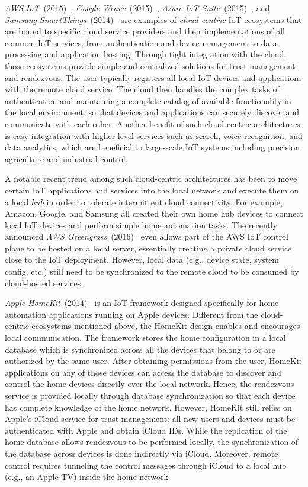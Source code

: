 \emph{AWS IoT}~(2015)~\cite{aws-iot}, \emph{Google Weave}~(2015)~\cite{weave}, \emph{Azure IoT Suite}~(2015)~\cite{azure-iot}, and \emph{Samsung SmartThings}~(2014)~\cite{smartthings} are examples of \emph{cloud-centric} IoT ecosystems that are bound to specific cloud service providers and their implementations of all common IoT services, from authentication and device management to data processing and application hosting.
Through tight integration with the cloud, those ecosystems provide simple and centralized solutions for trust management and rendezvous.
The user typically registers all local IoT devices and applications with the remote cloud service.
The cloud then handles the complex tasks of authentication and maintaining a complete catalog of available functionality in the local environment, so that devices and applications can securely discover and communicate with each other.
Another benefit of such cloud-centric architectures is easy integration with higher-level services such as search, voice recognition, and  data analytics, which are beneficial to large-scale IoT systems including precision agriculture and industrial control.

A notable recent trend among such cloud-centric architectures has been to move certain IoT applications and services into the local network and execute them on a local \emph{hub} in order to tolerate intermittent cloud connectivity.
For example, Amazon, Google, and Samsung all created their own home hub devices to connect local IoT devices and perform simple home automation tasks.
The recently announced \emph{AWS Greengrass}~(2016)~\cite{aws-greengrass} even allows part of the AWS IoT control plane to be hosted on a local server, essentially creating a private cloud service close to the IoT deployment.
However, local data (e.g., device state, system config, etc.) still need to be synchronized to the remote cloud to be consumed by cloud-hosted services.

\emph{Apple HomeKit}~(2014)~\cite{homekit} is an IoT framework designed specifically for home automation applications running on Apple devices.
Different from the cloud-centric ecosystems mentioned above, the HomeKit design enables and encourages local communication.
The framework stores the home configuration in a local database which is synchronized across all the devices that belong to or are authorized by the same user.
After obtaining permissions from the user, HomeKit applications on any of those devices can access the database to discover and control the home devices directly over the local network.
Hence, the rendezvous service is provided locally through database synchronization so that each device has complete knowledge of the home network.
However, HomeKit still relies on Apple's iCloud service for trust management: all new users and devices must be authenticated with Apple and obtain iCloud IDs.
While the replication of the home database allows rendezvous to be performed locally, the synchronization of the database across devices is done indirectly via iCloud.
Moreover, remote control requires tunneling the control messages through iCloud to a local hub (e.g., an Apple TV)
 inside the home network.


